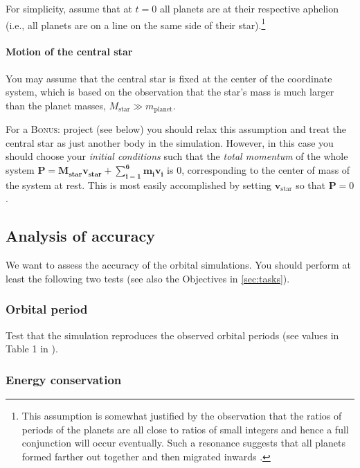\documentclass[letterpaper]{scrartcl}
\newcommand{\BONUS}{\textsc{Bonus: }}
\renewcommand{\vec}[1]{\ensuremath{\mathbf{#1}}}
\begin{document}
For simplicity, assume that at $t=0$ all planets are at their
respective aphelion (i.e., all planets are on a line on the same side
of their star).\footnote{This assumption is somewhat justified by
  the observation that the ratios of periods of the planets are all
  close to ratios of small integers and hence a full conjunction will
  occur eventually. Such a resonance suggests that all planets formed
  farther out together and then migrated inwards
  \citep{Gillon:2017aa}.}

\paragraph{Motion of the central star}

You may assume that the central star is fixed at the center of the
coordinate system, which is based on the observation that the star's
mass is much larger than the planet masses, $M_{\text{star}} \gg
m_{\text{planet}}$. 

For a \BONUS project (see below) you should relax this assumption and
treat the central star as just another body in the
simulation. However, in this case you should choose your \emph{initial
  conditions} such that the \emph{total momentum} of the whole system
$\vec{P = M_{\text{star}}\vec{v}_{\text{star}} + \sum_{i=1}^{6}m_{i}
  \vec{v}_{i}}$
is 0, corresponding to the center of mass of the system at rest. This
is most easily accomplished by setting $\vec{v}_{\text{star}}$ so that
$\vec{P}=0$.

\subsection{Analysis of accuracy}
\label{sec:accuracy}

We want to assess the accuracy of the orbital simulations. You should
perform at least the following two tests (see also the Objectives in
\ref{sec:tasks}).

\subsubsection{Orbital period}
\label{sec:period}

Test that the simulation reproduces the observed orbital periods (see
values in Table 1 in \citep{Gillon:2017aa}).

\subsubsection{Energy conservation}
\label{sec:energy}
\end{document}
